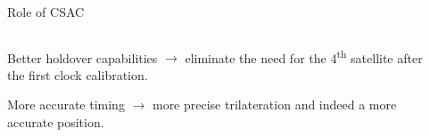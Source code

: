 



\begin{frame}{Role of CSAC}

    \begin{columns}[c, onlytextwidth]

        \begin{column}{0.55\textwidth}

            Better holdover capabilities $\rightarrow$ eliminate the need for the 4\textsuperscript{th} satellite after the first clock calibration.

            \vspace{10pt}

            More accurate timing $\rightarrow$ more precise trilateration and indeed a more accurate position.

        \end{column}

        \hfill

        \begin{column}{0.40\textwidth}


\end{column}
\end{columns}
\end{frame}
